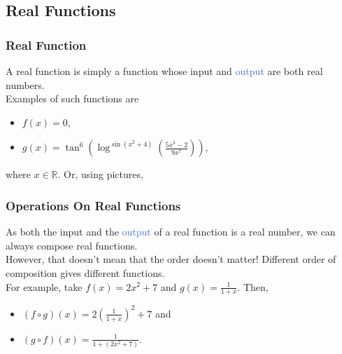 \documentclass[aspectratio=169,11pt,dvipsnames]{beamer}
\newcommand{\clr}{\textcolor{BrickRed}}
\newcommand{\clb}{\textcolor{RoyalBlue}}
\newcommand{\R}{\mathbb{R}}
\begin{document}
\subsection{Real Functions}

\begin{frame}
 \subsectionpage
\end{frame}

\begin{frame}
 \frametitle{Real Function}
 A \alert{real function} is simply a function whose \alert{\clr{input} and
 \clb{output} are both real numbers}. \\ \pause
 Examples of such functions are
 \begin{itemize}
  \item $f(x) = 0$,
  \item $g(x) = \tan^{6}(\log^{\sin(x^2 + 4)}(\frac{5x^3 - 2}{9x^{7}}))$,
 \end{itemize}
 where $x \in \R$. \pause Or, using pictures,
 \begin{center}
 \end{center}
\end{frame}

\begin{frame}
 \frametitle{Operations On Real Functions}
 As both the \clr{input} and the \clb{output} of a real function is a real
 number, \alert{we can always compose real functions}. \\ \pause
 However, that \alert{doesn't mean that the order doesn't matter!} Different
 order of composition gives different functions.\\ \pause
 For example, take $f(x) = 2x^2 + 7$ and $g(x) = \frac{1}{1 + x}$. Then,\pause
 \begin{itemize}
  \item $(f \circ g)(x) = 2 \left( \frac{1}{1+x} \right)^2 + 7$ and \pause
  \item $(g \circ f)(x) = \frac{1}{1 + (2x^2 + 7)}$.
 \end{itemize}
\end{frame}
\end{document}
